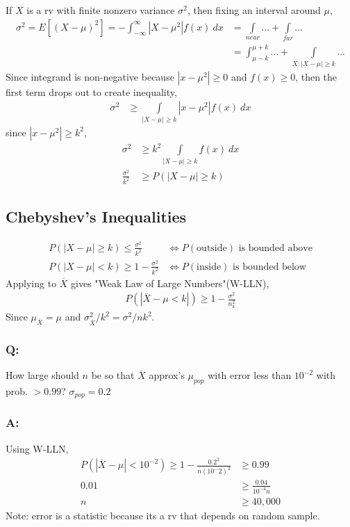 \documentclass{article}
\begin{document}
If $X$ is a rv with finite nonzero variance $\sigma^2$, then fixing an interval around $\mu$,
\begin{align*}
\sigma^2 = E[(X-\mu)^2] = -\int_{-\infty}^{\infty}|X-\mu^2|f(x)\ dx &= \int\limits_{near}\dots + \int\limits_{far} \dots \\
&= \int_{\mu-k}^{\mu+k}\dots + \int\limits_{X:|X-\mu|\geq k}\dots
\end{align*}
Since integrand is non-negative because $|x-\mu^2|\geq 0$ and $f(x)\geq0$, then the first term drops out to create inequality,
\begin{align*}
\sigma^2 &\geq \int\limits_{|X-\mu|\geq k}|x-\mu^2|f(x)\ dx
\end{align*}
since $|x-\mu^2|\geq k^2$,
\begin{align*}
\sigma^2 &\geq k^2 \int\limits_{|X-\mu|\geq k} f(x)\ dx\\
\frac{\sigma^2}{k^2}&\geq P(|X-\mu|\geq k)
\end{align*}
\subsection*{Chebyshev's Inequalities}
\begin{align*}
P(|X-\mu|\geq k) \leq \frac{\sigma^2}{k^2} &\iff P(\text{outside})\text{ is bounded above} \\
P(|X-\mu|<k) \geq 1 - \frac{\sigma^2}{k^2} &\iff P(\text{inside})\text{ is bounded below}
\end{align*}
Applying to $\overline{X}$ gives "Weak Law of Large Numbers"(W-LLN),
\begin{align*}
P\left(|\overline{X}-\mu<k|\right) \geq 1 - \frac{\sigma^2}{n_k^2}
\end{align*}
Since $\mu_{\overline{X}} = \mu$ and $\sigma_{\overline{X}}^2/k^2 = \sigma^2/nk^2$.
\newline
\subsubsection*{Q:} How large should $n$ be so that $\overline{X}$ approx's $\mu_{pop}$ with error less than $10^{-2}$ with prob. $>0.99$? $\sigma_{pop}=0.2$
\newline
\subsubsection*{A:} Using W-LLN,
\begin{align*}
P(|\overline{X}-\mu|<10^{-2})\geq 1 - \frac{0.2^2}{n(10^-2)^2} &\geq 0.99 \\
0.01 &\geq \frac{0.04}{10^{-4}n}\\
n&\geq 40,000
\end{align*}
Note: error is a statistic because its a rv that depends on random sample.
\end{document}
